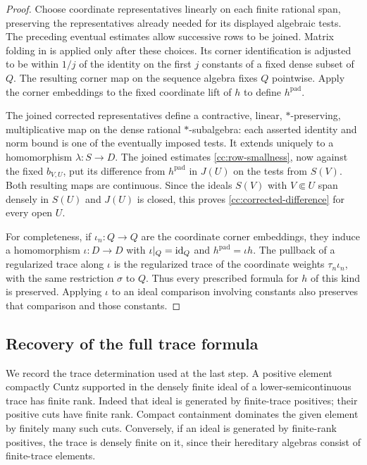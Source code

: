 \begin{proof}
Choose coordinate representatives linearly on each finite
rational span, preserving the representatives already needed
for its displayed algebraic tests.  The preceding eventual
estimates allow successive rows to be joined.  Matrix folding
in  is applied only after these choices.  Its
corner identification is adjusted to be within $1/j$ of the
identity on the first $j$ constants of a fixed dense subset of
$Q$.  The resulting corner map on the sequence algebra fixes
$Q$ pointwise.  Apply the corner embeddings to the fixed coordinate
lift of $h$ to define
$h^{\mathrm{pad}}$.

The joined corrected representatives define a contractive,
linear, $*$-preserving, multiplicative map on the dense
rational $*$-subalgebra: each asserted identity and norm bound
is one of the eventually imposed tests.  It extends uniquely
to a homomorphism $\lambda:S\to D$.  The joined estimates
\eqref{cc:row-smallness}, now against the fixed
$b_{V,U}$, put its difference from $h^{\mathrm{pad}}$ in
$J(U)$ on the tests from $S(V)$.  Both resulting maps are
continuous.  Since the ideals $S(V)$ with $V\Subset U$ span
densely in $S(U)$ and $J(U)$ is closed, this proves
\eqref{cc:corrected-difference} for every open $U$.

For completeness, if $\iota_n:Q\to Q$ are the coordinate
corner embeddings, they induce a homomorphism $\iota:D\to D$
with $\iota|_Q=\operatorname{id}_Q$ and $h^{\mathrm{pad}}=\iota h$.
The pullback of a regularized trace along $\iota$ is the
regularized trace of the coordinate weights
$\tau_n\iota_n$, with the same restriction $\sigma$ to $Q$.
Thus every prescribed formula for $h$ of this kind is
preserved.  Applying $\iota$ to an ideal comparison involving
constants also preserves that comparison and those constants.
\end{proof}

\subsection{Recovery of the full trace formula}

We record the trace determination used at the last step.  A
positive element compactly Cuntz supported in the densely
finite ideal of a lower-semicontinuous trace has finite rank.
Indeed that ideal is generated by finite-trace positives;
their positive cuts have finite rank.  Compact containment
dominates the given element by finitely many such cuts.
Conversely, if an ideal is generated by finite-rank positives,
the trace is densely finite on it, since their hereditary
algebras consist of finite-trace elements.

